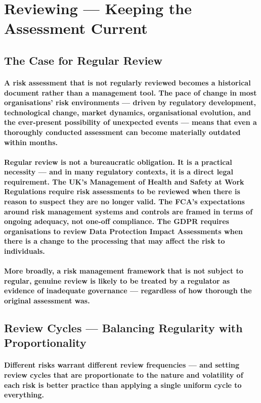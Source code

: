 \section{Reviewing — Keeping the Assessment Current}
\subsection{The Case for Regular Review}
\paragraph{A risk assessment that is not regularly reviewed becomes a historical document rather than a management tool. The pace of change in most organisations' risk environments — driven by regulatory development, technological change, market dynamics, organisational evolution, and the ever-present possibility of unexpected events — means that even a thoroughly conducted assessment can become materially outdated within months.}
\paragraph{Regular review is not a bureaucratic obligation. It is a practical necessity — and in many regulatory contexts, it is a direct legal requirement. The UK's Management of Health and Safety at Work Regulations require risk assessments to be reviewed when there is reason to suspect they are no longer valid. The FCA's expectations around risk management systems and controls are framed in terms of ongoing adequacy, not one-off compliance. The GDPR requires organisations to review Data Protection Impact Assessments when there is a change to the processing that may affect the risk to individuals.}
\paragraph{More broadly, a risk management framework that is not subject to regular, genuine review is likely to be treated by a regulator as evidence of inadequate governance — regardless of how thorough the original assessment was.}

\subsection{Review Cycles — Balancing Regularity with Proportionality}
\paragraph{Different risks warrant different review frequencies — and setting review cycles that are proportionate to the nature and volatility of each risk is better practice than applying a single uniform cycle to everything.}
